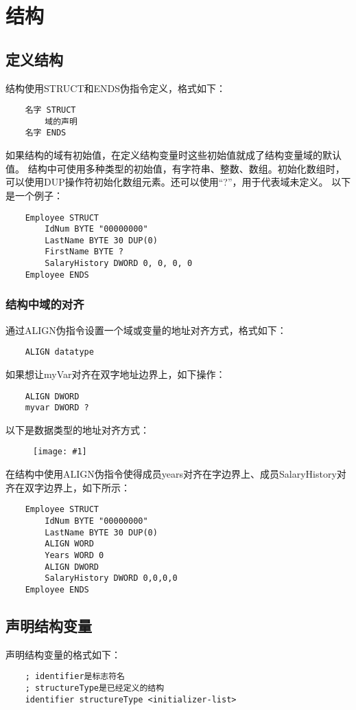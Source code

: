\documentclass[a4paper,left=2.5cm,right=2.5cm,11pt]{article}
\newcommand{\fic}[1]{\begin{figure}[H]
		\center
		\texttt{[image: \#1]}
	\end{figure}}
\begin{document}
\tableofcontents

\clearpage

\section{结构}
\subsection{定义结构}
	结构使用STRUCT和ENDS伪指令定义，格式如下：
	\begin{lstlisting}
	名字 STRUCT
		域的声明
	名字 ENDS
	\end{lstlisting}	

	如果结构的域有初始值，在定义结构变量时这些初始值就成了结构变量域的默认值。
	结构中可使用多种类型的初始值，有字符串、整数、数组。初始化数组时，可以使用DUP操作符初始化数组元素。还可以使用“?”，用于代表域未定义。
	以下是一个例子：
	\begin{lstlisting}
	Employee STRUCT
		IdNum BYTE "00000000"
		LastName BYTE 30 DUP(0)
		FirstName BYTE ?
		SalaryHistory DWORD 0, 0, 0, 0
	Employee ENDS
	\end{lstlisting}

\subsubsection{结构中域的对齐}
	通过ALIGN伪指令设置一个域或变量的地址对齐方式，格式如下：
	\begin{lstlisting}
	ALIGN datatype
	\end{lstlisting}

	如果想让myVar对齐在双字地址边界上，如下操作：
	\begin{lstlisting}
	ALIGN DWORD
	myvar DWORD ?
	\end{lstlisting}

	以下是数据类型的地址对齐方式：
	\fic{1.png}

	在结构中使用ALIGN伪指令使得成员years对齐在字边界上、成员SalaryHistory对齐在双字边界上，如下所示：
	\begin{lstlisting}
	Employee STRUCT
		IdNum BYTE "00000000"
		LastName BYTE 30 DUP(0)
		ALIGN WORD
		Years WORD 0
		ALIGN DWORD
		SalaryHistory DWORD 0,0,0,0
	Employee ENDS
	\end{lstlisting}

\subsection{声明结构变量}
	声明结构变量的格式如下：
	\begin{lstlisting}
	; identifier是标志符名
	; structureType是已经定义的结构
	identifier structureType <initializer-list>
	\end{lstlisting}
\end{document}
